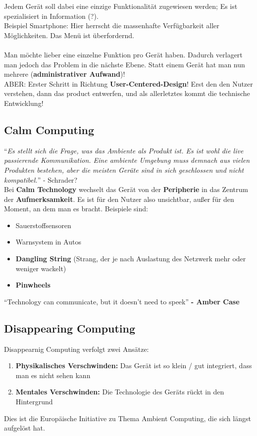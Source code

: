 \documentclass[a4paper]{article}
\begin{document}
Jedem Gerät soll dabei eine einzige Funktionalität zugewiesen werden; Es ist spezialisiert in Information (?).\\
Beispiel Smartphone: Hier herrscht die massenhafte Verfügbarkeit aller Möglichkeiten. Das Menü ist überfordernd. \\
\\
Man möchte lieber eine einzelne Funktion pro Gerät haben. Dadurch verlagert man jedoch das Problem in die nächste Ebene. Statt einem Gerät hat man nun mehrere (\textbf{administrativer Aufwand})!\\
ABER: Erster Schritt in Richtung \textbf{User-Centered-Design}! Erst den den Nutzer verstehen, dann das product entwerfen, und als allerletztes kommt die technische Entwicklung!

\subsection{Calm Computing}
``\textit{Es stellt sich die Frage, was das Ambiente als Produkt ist. Es ist wohl die live passierende Kommunikation. Eine ambiente Umgebung muss demnach aus vielen Produkten bestehen, aber die meisten Geräte sind in sich geschlossen und nicht kompatibel.}'' - Schrader?\\

Bei \textbf{Calm Technology} wechselt das Gerät von der \textbf{Peripherie} in das Zentrum der \textbf{Aufmerksamkeit}. Es ist für den Nutzer also unsichtbar, außer für den Moment, an dem man es bracht. Beispiele sind:
\begin{itemize}
	\item Sauerstoffsensoren
	\item Warnsystem in Autos
	\item \textbf{Dangling String} (Strang, der je nach Auslastung des Netzwerk mehr oder weniger wackelt)
	\item \textbf{Pinwheels}
\end{itemize}
``Technology can communicate, but it doesn't need to speek'' \textbf{- Amber Case}

\subsection{Disappearing Computing}
Disappearnig Computing verfolgt zwei Ansätze:
\begin{enumerate}
	\item \textbf{Physikalisches Verschwinden:} Das Gerät ist so klein / gut integriert, dass man es nicht sehen kann
	\item \textbf{Mentales Verschwinden:} Die Technologie des Geräts rückt in den Hintergrund
\end{enumerate}
Dies ist die Europäische Initiative zu Thema Ambient Computing, die sich längst aufgelöst hat.
\end{document}
